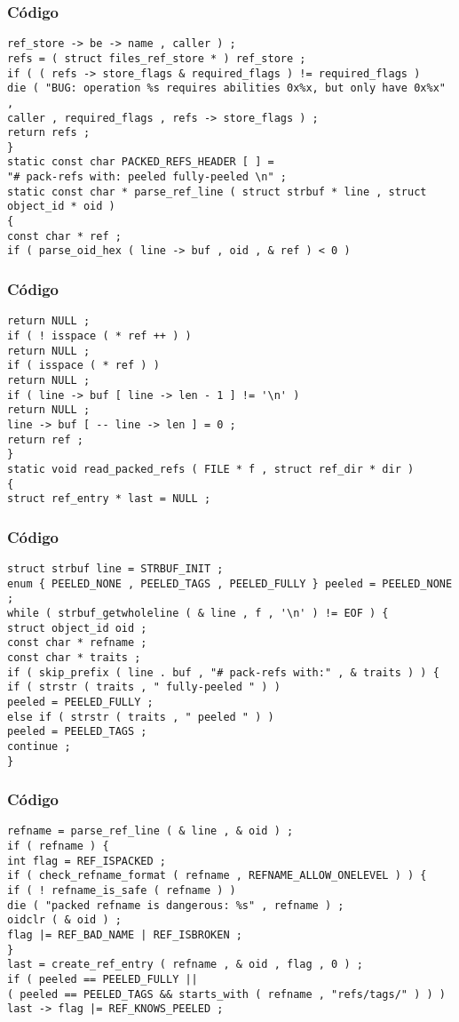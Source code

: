 \documentclass{beamer}
\begin{document}
\begin{frame}[fragile]
\frametitle{C\'odigo}
\begin{verbatim}
ref_store -> be -> name , caller ) ; 
refs = ( struct files_ref_store * ) ref_store ; 
if ( ( refs -> store_flags & required_flags ) != required_flags ) 
die ( "BUG: operation %s requires abilities 0x%x, but only have 0x%x" , 
caller , required_flags , refs -> store_flags ) ; 
return refs ; 
} 
static const char PACKED_REFS_HEADER [ ] = 
"# pack-refs with: peeled fully-peeled \n" ; 
static const char * parse_ref_line ( struct strbuf * line , struct object_id * oid ) 
{ 
const char * ref ; 
if ( parse_oid_hex ( line -> buf , oid , & ref ) < 0 ) 
\end{verbatim}
\end{frame}
\begin{frame}[fragile]
\frametitle{C\'odigo}
\begin{verbatim}
return NULL ; 
if ( ! isspace ( * ref ++ ) ) 
return NULL ; 
if ( isspace ( * ref ) ) 
return NULL ; 
if ( line -> buf [ line -> len - 1 ] != '\n' ) 
return NULL ; 
line -> buf [ -- line -> len ] = 0 ; 
return ref ; 
} 
static void read_packed_refs ( FILE * f , struct ref_dir * dir ) 
{ 
struct ref_entry * last = NULL ; 
\end{verbatim}
\end{frame}
\begin{frame}[fragile]
\frametitle{C\'odigo}
\begin{verbatim}
struct strbuf line = STRBUF_INIT ; 
enum { PEELED_NONE , PEELED_TAGS , PEELED_FULLY } peeled = PEELED_NONE ; 
while ( strbuf_getwholeline ( & line , f , '\n' ) != EOF ) { 
struct object_id oid ; 
const char * refname ; 
const char * traits ; 
if ( skip_prefix ( line . buf , "# pack-refs with:" , & traits ) ) { 
if ( strstr ( traits , " fully-peeled " ) ) 
peeled = PEELED_FULLY ; 
else if ( strstr ( traits , " peeled " ) ) 
peeled = PEELED_TAGS ; 
continue ; 
} 
\end{verbatim}
\end{frame}
\begin{frame}[fragile]
\frametitle{C\'odigo}
\begin{verbatim}
refname = parse_ref_line ( & line , & oid ) ; 
if ( refname ) { 
int flag = REF_ISPACKED ; 
if ( check_refname_format ( refname , REFNAME_ALLOW_ONELEVEL ) ) { 
if ( ! refname_is_safe ( refname ) ) 
die ( "packed refname is dangerous: %s" , refname ) ; 
oidclr ( & oid ) ; 
flag |= REF_BAD_NAME | REF_ISBROKEN ; 
} 
last = create_ref_entry ( refname , & oid , flag , 0 ) ; 
if ( peeled == PEELED_FULLY || 
( peeled == PEELED_TAGS && starts_with ( refname , "refs/tags/" ) ) ) 
last -> flag |= REF_KNOWS_PEELED ; 
\end{verbatim}
\end{frame}
\end{document}

